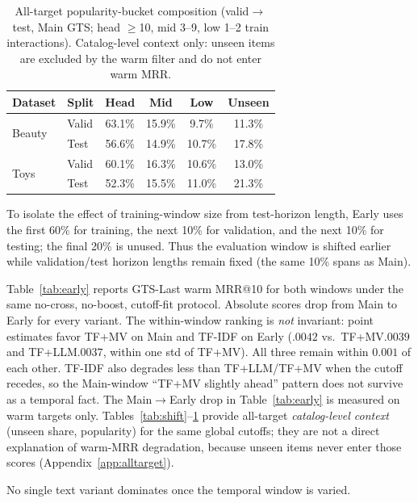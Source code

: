 \documentclass[sigconf,natbib=true,anonymous]{acmart}
\newcommand{\tfidf}{\textsc{TF-IDF}\xspace}
\newcommand{\tfllm}{\textsc{TF+LLM}\xspace}
\newcommand{\tfmv}{\textsc{TF+MV}\xspace}
\begin{document}
\begin{table}[t]
\centering
\caption{%
All-target popularity-bucket composition (valid$\to$test, Main GTS; head $\ge$10, mid 3--9, low 1--2 train interactions).
Catalog-level context only: unseen items are excluded by the warm filter and do not enter warm MRR.%
}
\label{tab:bucket}
\small
\setlength{\tabcolsep}{3.5pt}
\begin{tabular}{@{}llcccc@{}}
\toprule
Dataset & Split & Head & Mid & Low & Unseen \\
\midrule
\multirow{2}{*}{Beauty}
 & Valid & 63.1\% & 15.9\% & 9.7\% & 11.3\% \\
 & Test  & 56.6\% & 14.9\% & 10.7\% & 17.8\% \\
\midrule
\multirow{2}{*}{Toys}
 & Valid & 60.1\% & 16.3\% & 10.6\% & 13.0\% \\
 & Test  & 52.3\% & 15.5\% & 11.0\% & 21.3\% \\
\bottomrule
\end{tabular}
\end{table}

To isolate the effect of training-window size from test-horizon length, Early uses the first 60\% for training, the next 10\% for validation, and the next 10\% for testing; the final 20\% is unused.
Thus the evaluation window is shifted earlier while validation/test horizon lengths remain fixed (the same 10\% spans as Main).

Table~\ref{tab:early} reports GTS-Last warm MRR@10 for both windows under the same no-cross, no-boost, cutoff-fit protocol.
Absolute scores drop from Main to Early for every variant.
The within-window ranking is \emph{not} invariant: point estimates favor \tfmv on Main and \tfidf on Early ($.0042$ vs.\ \tfmv $.0039$ and \tfllm $.0037$, within one std of \tfmv).
All three remain within $0.001$ of each other.
\tfidf also degrades less than \tfllm/\tfmv when the cutoff recedes, so the Main-window ``\tfmv slightly ahead'' pattern does not survive as a temporal fact.
The Main$\to$Early drop in Table~\ref{tab:early} is measured on warm targets only.
Tables~\ref{tab:shift}--\ref{tab:bucket} provide all-target \emph{catalog-level context} (unseen share, popularity) for the same global cutoffs; they are not a direct explanation of warm-MRR degradation, because unseen items never enter those scores (Appendix~\ref{app:alltarget}).

No single text variant dominates once the temporal window is varied.
\end{document}
